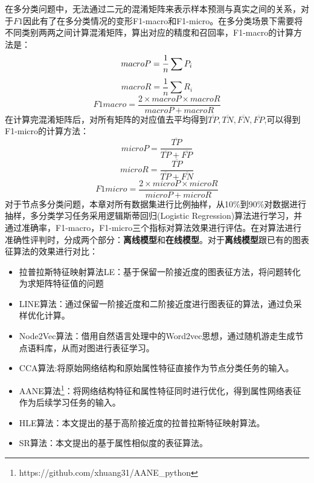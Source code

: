 在多分类问题中，无法通过二元的混淆矩阵来表示样本预测与真实之间的关系，对于$F1$因此有了在多分类情况的变形F1-macro和F1-micro。在多分类场景下需要将不同类别两两之间计算混淆矩阵，算出对应的精度和召回率，F1-macro的计算方法是：
\begin{equation}
	macro\-P = \frac{1}{n}\sum P_i
\end{equation}
\begin{equation}
macroR = \frac{1}{n}\sum R_i
\end{equation}
\begin{equation}
F1macro = \frac{2\times macroP\times macroR}{macroP+macroR}
\end{equation}
在计算完混淆矩阵后，对所有矩阵的对应值去平均得到$\overline{TP}, \overline{TN}, \overline{FN},\overline{FP}$,可以得到F1-micro的计算方法：
\begin{equation}
microP = \frac{\overline{TP}}{\overline{TP}+\overline{FP}}
\end{equation}
\begin{equation}
microR = \frac{\overline{TP}}{\overline{TP}+\overline{FN}}
\end{equation}
\begin{equation}
F1micro = \frac{2\times microP\times microR}{microP+microR}
\end{equation}
对于节点多分类问题，本章对所有数据集进行比例抽样，从10\%到90\%对数据进行抽样，多分类学习任务采用逻辑斯蒂回归(Logistic Regression)算法进行学习，并通过准确率，F1-macro，F1-micro三个指标对算法效果进行评估。在对算法进行准确性评判时，分成两个部分：\textbf{离线模型}和\textbf{在线模型}。对于\textbf{离线模型}跟已有的图表征算法的效果进行对比：
\begin{itemize}
	\item 拉普拉斯特征映射算法LE：基于保留一阶接近度的图表征方法，将问题转化为求矩阵特征值的问题
	\item LINE算法：通过保留一阶接近度和二阶接近度进行图表征的算法，通过负采样优化计算。
	\item Node2Vec算法：借用自然语言处理中的Word2vec思想，通过随机游走生成节点语料库，从而对图进行表征学习。
	\item CCA算法\cite{hardoon2004canonical}:将原始网络结构和原始属性特征直接作为节点分类任务的输入。
	\item AANE算法\cite{huang2017label}\footnote{https://github.com/xhuang31/AANE\_python}：将网络结构特征和属性特征同时进行优化，得到属性网络表征作为后续学习任务的输入。
	\item HLE算法：本文提出的基于高阶接近度的拉普拉斯特征映射算法。
	\item SR算法：本文提出的基于属性相似度的表征算法。
\end{itemize}
